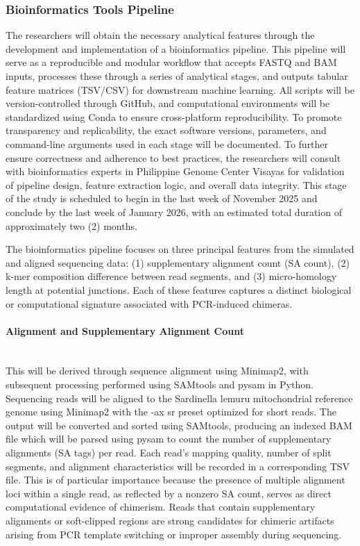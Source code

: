  \subsubsection{Bioinformatics Tools Pipeline} 
 The researchers will obtain the necessary analytical features through the development and implementation of a bioinformatics pipeline. This pipeline will serve as a reproducible and modular workflow that accepts FASTQ and BAM inputs, processes these through a series of analytical stages, and outputs tabular feature matrices (TSV/CSV) for downstream machine learning. All scripts will be version-controlled through GitHub, and computational environments will be standardized using Conda to ensure cross-platform reproducibility. To promote transparency and replicability, the exact software versions, parameters, and command-line arguments used in each stage will be documented. To further ensure correctness and adherence to best practices, the researchers will consult with bioinformatics experts in Philippine Genome Center Visayas for validation of pipeline design, feature extraction logic, and overall data integrity. This stage of the study is scheduled to begin in the last week of November 2025 and conclude by the last week of January 2026, with an estimated total duration of approximately two (2) months. 
 
The bioinformatics pipeline focuses on three principal features from the simulated and aligned sequencing data:  (1) supplementary alignment count (SA count), (2) k-mer composition difference between read segments, and (3) micro-homology length at potential junctions. Each of these features captures a distinct biological or computational signature associated with PCR-induced chimeras.

\paragraph{Alignment and Supplementary Alignment Count}\hfill\\
This will be derived through sequence alignment using Minimap2, with subsequent processing performed using SAMtools and pysam in Python. Sequencing reads will be aligned to the Sardinella lemuru mitochondrial reference genome using Minimap2 with the -ax sr preset optimized for short reads. The output will be converted and sorted using SAMtools, producing an indexed BAM file which will be parsed using pysam to count the number of supplementary alignments (SA tags) per read. Each read’s mapping quality, number of split segments, and alignment characteristics will be recorded in a corresponding TSV file. This is of particular importance because the presence of multiple alignment loci within a single read, as reflected by a nonzero SA count, serves as direct computational evidence of chimerism. Reads that contain supplementary alignments or soft-clipped regions are strong candidates for chimeric artifacts arising from PCR template switching or improper assembly during sequencing.

